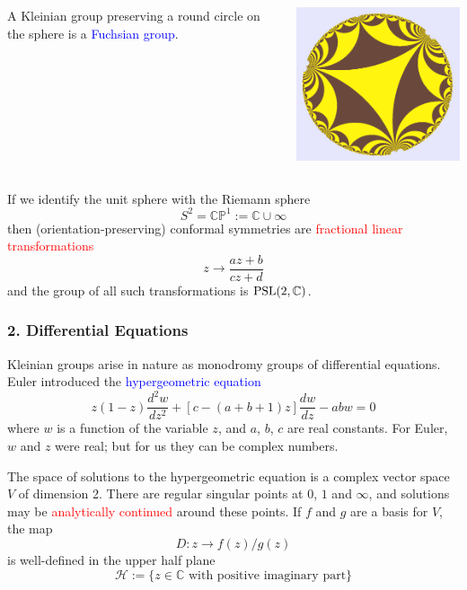 \documentclass{beamer}
\def\HH{\mathcal{H}}
\def\CP{\mathbb{CP}}
\def\C{\mathbb{C}}
\def\PSL{\textnormal{PSL}}
\begin{document}
\frame
{
\begin{columns}[c]
\column{1.1in}
A Kleinian group 
preserving a round circle
on the sphere is a
\textcolor{blue}{Fuchsian group}.
\column{3in}
\begin{center}
\includegraphics[width=3in]{fuchsian.png}
\end{center}
\end{columns}
}
\frame
{
If we identify the unit sphere with the \textcolor{dgreen}{Riemann sphere} 
$$S^2 = \CP^1:=\C\cup \infty$$
then (orientation-preserving) conformal symmetries are \textcolor{red}{fractional linear
transformations}
$$z \to \frac {az+b} {cz+d}$$
and the group of all such transformations is $\PSL(2,\C)$.
}
\frame
{
\frametitle{2. Differential Equations}

Kleinian groups arise in nature as monodromy groups of \textcolor{dgreen}{differential equations}.
\vskip 5pt
Euler introduced the \textcolor{blue}{hypergeometric equation}
$$z(1-z)\frac {d^2w}{dz^2} + [c - (a+b+1)z]\frac {dw}{dz} - abw = 0$$
where $w$ is a function of the variable $z$, and $a$, $b$, $c$ are real constants.
\vskip 10pt
For Euler, $w$ and $z$ were real; but for us they can be complex numbers.
}
\frame
{The space of solutions to the hypergeometric equation
is a complex vector space $V$ of dimension 2. 
\vskip 10pt
There are \textcolor{dgreen}{regular singular points}
at $0$, $1$ and $\infty$, and solutions may be \textcolor{red}{analytically continued} 
around these points.
\vskip 10pt
If $f$ and $g$ are a basis for $V$, the map $$D:z \to f(z)/g(z)$$ is well-defined
in the \textcolor{dgreen}{upper half plane}
$$\HH:=\lbrace z \in \C \text{ with positive imaginary part} \rbrace$$
}
\frame
\end{document}
